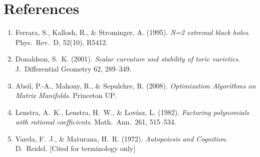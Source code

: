 \documentclass[11pt,a4paper]{article}
\begin{document}
\section*{References}
\begin{enumerate}
    \item Ferrara, S., Kallosh, R., \& Strominger, A. (1995). \textit{N=2 extremal black holes}. Phys.\ Rev.\ D, 52(10), R5412.
    \item Donaldson, S.\ K. (2001). \textit{Scalar curvature and stability of toric varieties}. J.\ Differential Geometry 62, 289--349.
    \item Absil, P.-A., Mahony, R., \& Sepulchre, R. (2008). \textit{Optimization Algorithms on Matrix Manifolds}. Princeton UP.
    \item Lenstra, A.\ K., Lenstra, H.\ W., \& Lov\'{a}sz, L. (1982). \textit{Factoring polynomials with rational coefficients}. Math.\ Ann.\ 261, 515--534.
    \item Varela, F.\ J., \& Maturana, H.\ R. (1972). \textit{Autopoiesis and Cognition}. D.\ Reidel. [Cited for terminology only]
\end{enumerate}
\end{document}
